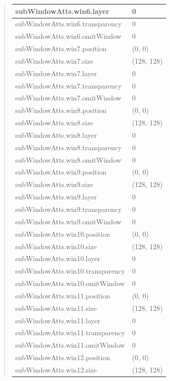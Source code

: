 \documentclass[letterpaper,10pt,english]{sphinxmanual}
\begin{document}
\begin{quote}
\begin{longtable}{|l|l|}
\hline
subWindowAtts.win6.layer
 & 
0
\\
\hline
subWindowAtts.win6.transparency
 & 
0
\\
\hline
subWindowAtts.win6.omitWindow
 & 
0
\\
\hline
subWindowAtts.win7.position
 & 
(0, 0)
\\
\hline
subWindowAtts.win7.size
 & 
(128, 128)
\\
\hline
subWindowAtts.win7.layer
 & 
0
\\
\hline
subWindowAtts.win7.transparency
 & 
0
\\
\hline
subWindowAtts.win7.omitWindow
 & 
0
\\
\hline
subWindowAtts.win8.position
 & 
(0, 0)
\\
\hline
subWindowAtts.win8.size
 & 
(128, 128)
\\
\hline
subWindowAtts.win8.layer
 & 
0
\\
\hline
subWindowAtts.win8.transparency
 & 
0
\\
\hline
subWindowAtts.win8.omitWindow
 & 
0
\\
\hline
subWindowAtts.win9.position
 & 
(0, 0)
\\
\hline
subWindowAtts.win9.size
 & 
(128, 128)
\\
\hline
subWindowAtts.win9.layer
 & 
0
\\
\hline
subWindowAtts.win9.transparency
 & 
0
\\
\hline
subWindowAtts.win9.omitWindow
 & 
0
\\
\hline
subWindowAtts.win10.position
 & 
(0, 0)
\\
\hline
subWindowAtts.win10.size
 & 
(128, 128)
\\
\hline
subWindowAtts.win10.layer
 & 
0
\\
\hline
subWindowAtts.win10.transparency
 & 
0
\\
\hline
subWindowAtts.win10.omitWindow
 & 
0
\\
\hline
subWindowAtts.win11.position
 & 
(0, 0)
\\
\hline
subWindowAtts.win11.size
 & 
(128, 128)
\\
\hline
subWindowAtts.win11.layer
 & 
0
\\
\hline
subWindowAtts.win11.transparency
 & 
0
\\
\hline
subWindowAtts.win11.omitWindow
 & 
0
\\
\hline
subWindowAtts.win12.position
 & 
(0, 0)
\\
\hline
subWindowAtts.win12.size
 & 
(128, 128)
\\

\end{longtable}
\end{quote}
\end{document}

